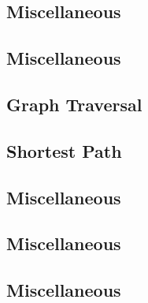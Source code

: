 \subsection{Miscellaneous}
\raggedbottom
\vspace{-.7\baselineskip}\hrulefill
\vspace{0.1\baselineskip}\subsection{Miscellaneous}
\raggedbottom
\vspace{-.7\baselineskip}\hrulefill
\vspace{0.1\baselineskip}\subsection{Graph Traversal}
\raggedbottom
\vspace{-.7\baselineskip}\hrulefill
\vspace{0.1\baselineskip}\subsection{Shortest Path}
\raggedbottom
\vspace{-.7\baselineskip}\hrulefill
\vspace{0.1\baselineskip}\subsection{Miscellaneous}
\raggedbottom
\vspace{-.7\baselineskip}\hrulefill
\vspace{0.1\baselineskip}\subsection{Miscellaneous}
\raggedbottom
\vspace{-.7\baselineskip}\hrulefill
\vspace{0.1\baselineskip}\subsection{Miscellaneous}
\raggedbottom
